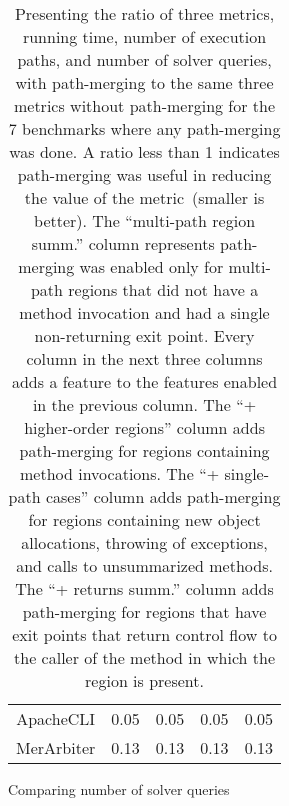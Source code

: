 \begin{table}
\begin{subtable}[t]{0.50\textwidth}
\begin{tabular}{@{}ccccc@{}}
                ApacheCLI                                                & 0.05                                                              & 0.05                                                             & 0.05                                                           & 0.05                                                     \\
                MerArbiter                                               & 0.13                                                              & 0.13                                                             & 0.13                                                           & 0.13                                                     \\ \bottomrule
            \end{tabular}
        \caption{Comparing number of solver queries}
        \label{table:numqueries-comparison}
    \end{subtable}

    \caption{Presenting the ratio of three metrics, running time, number of execution paths, and number of solver queries,
with path-merging to the same three metrics without path-merging for the 7 benchmarks where any path-merging was done. A
ratio less than 1 indicates path-merging was useful in reducing the value of the metric~(smaller is better). The
``multi-path region summ.'' column represents path-merging was enabled only for multi-path regions that did not have a
method invocation and had a single non-returning exit point. Every column in the next three columns adds a feature to
the features enabled in the previous column. The ``+ higher-order regions'' column adds path-merging for regions
containing method invocations. The ``+ single-path cases'' column adds path-merging for regions containing new object
allocations, throwing of exceptions, and calls to unsummarized methods. The ``+ returns summ.'' column adds path-merging
for regions that have exit points that return control flow to the caller of the method in which the region is present.}
    \label{table:comparison-table}
\end{table}